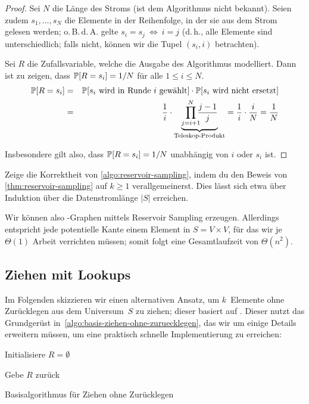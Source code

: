 \begin{proof}
    Sei $N$ die Länge des Stroms (ist dem Algorithmus nicht bekannt).
    Seien zudem $s_1, \ldots, s_N$ die Elemente in der Reihenfolge, in der sie aus dem Strom gelesen werden;
    o.\,B.\,d.\,A. gelte $s_i = s_j \ \Leftrightarrow\ i = j$ (d.\,h., alle Elemente sind unterschiedlich; falls nicht, können wir die Tupel $(s_i, i)$ betrachten).

    Sei $R$ die Zufallsvariable, welche die Ausgabe des Algorithmus modelliert.
    Dann ist zu zeigen, dass $\mathbb{P}\!\left[R = s_i\right] = 1 / N$ für alle $1 \le i \le N$.
    \begin{eqnarray}
        \prob{R = s_i} &=& \prob{\text{$s_i$ wird in Runde~$i$ gewählt}} \cdot \prob{\text{$s_i$ wird nicht ersetzt}} \\
        &=& \frac{1}{i} \cdot \underbrace{\smashoperator[r]{\prod_{j=i+1}^N} \frac{j-1}{j}}_{\text{Teleskop-Produkt}}
        = \frac{1}{i} \cdot \frac{i}{N} = \frac{1}{N}
    \end{eqnarray}

    \noindent Insbesondere gilt also, dass $\mathbb{P}\!\left[R = s_i\right] = 1/N$ unabhängig von $i$ oder $s_i$ ist.
\end{proof}

\begin{exercise}
    Zeige die Korrektheit von \cref{algo:reservoir-sampling}, indem du den Beweis von \cref{thm:reservoir-sampling} auf $k \ge 1$ verallgemeinerst.
    Dies lässt sich etwa über Induktion über die Datenstromlänge $|S|$ erreichen.
\end{exercise}

Wir können also \Gnm-Graphen mittels Reservoir Sampling erzeugen.
Allerdings entspricht jede potentielle Kante einem Element in $S = V \times V$, für das wir je $\Theta(1)$ Arbeit verrichten müssen;
somit folgt eine Gesamtlaufzeit von $\Theta(n^2)$.

\subsection{Ziehen mit Lookups}
Im Folgenden skizzieren wir einen alternativen Ansatz, um $k$~Elemente ohne Zurücklegen aus dem Universum~$S$ zu ziehen; dieser basiert auf \cite{batagelj2005efficient}.
Dieser nutzt das Grundgerüst in~\cref{algo:basis-ziehen-ohne-zuruecklegen}, das wir um einige Details erweitern müssen, um eine praktisch schnelle Implementierung zu erreichen:

\begin{algorithm}[H]

    Initialisiere $R = \emptyset$\;


    Gebe $R$ zurück

    \caption{Basisalgorithmus für Ziehen ohne Zurücklegen}
    \label{algo:basis-ziehen-ohne-zuruecklegen}
\end{algorithm}

